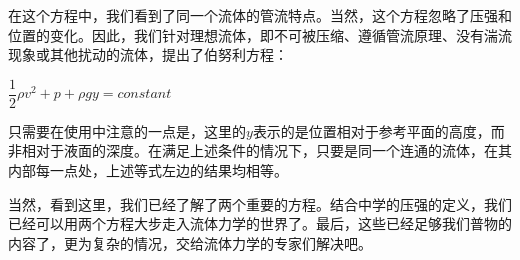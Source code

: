 在这个方程中，我们看到了同一个流体的管流特点。当然，这个方程忽略了压强和位置的变化。因此，我们针对理想流体，即不可被压缩、遵循管流原理、没有湍流现象或其他扰动的流体，提出了伯努利方程：
\begin{law}
    \centering
    $\dfrac{1}{2}\rho v^2 +p+\rho gy=constant$
\end{law}

只需要在使用中注意的一点是，这里的$y$表示的是位置相对于参考平面的高度，而非相对于液面的深度。在满足上述条件的情况下，只要是同一个连通的流体，在其内部每一点处，上述等式左边的结果均相等。

当然，看到这里，我们已经了解了两个重要的方程。结合中学的压强的定义，我们已经可以用两个方程大步走入流体力学的世界了。最后，这些已经足够我们普物的内容了，更为复杂的情况，交给流体力学的专家们解决吧。